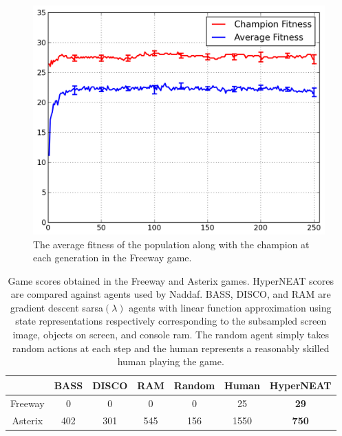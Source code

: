 \documentclass{acm_proc_article-sp}
\begin{document}
\begin{figure}[ht]
\begin{center}
\includegraphics[width=\columnwidth]{figures/freeway-results.png}
\end{center}
\caption{The average fitness of the population along with the champion at each generation in the Freeway game.}
\label{fig:freeway-curve}
\end{figure}

\begin{table}
\begin{center}
\begin{tabular}{|c|c|c|c|c|c|c|}
\hline
~       & BASS & DISCO & RAM & Random & Human & HyperNEAT \\ \hline
Freeway & 0    & 0     & 0   & 0      & 25    & \textbf{29}        \\ \hline
Asterix & 402  & 301   & 545 & 156    & 1550  & \textbf{750}       \\ 
\hline
\end{tabular}
\end{center}
\label{tab:results-table}
\caption{Game scores obtained in the Freeway and Asterix games. HyperNEAT scores are compared against agents used by Naddaf\cite{naddaf10}. BASS, DISCO, and RAM are gradient descent sarsa$(\lambda)$ agents with linear function approximation using state representations respectively corresponding to the subsampled screen image, objects on screen, and console ram. The random agent simply takes random actions at each step and the human represents a reasonably skilled human playing the game.}
\end{table}
\end{document}
